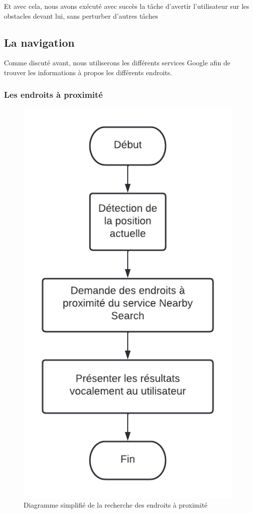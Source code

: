 Et avec cela, nous avons exécuté avec succès la tâche d’avertir l’utilisateur sur les obstacles devant lui, sans perturber d’autres tâches

\subsection{La navigation}
Comme discuté avant, nous utiliserons les différents services Google afin de trouver les informations à propos les différents endroits.

\subsubsection{Les endroits à proximité}

\begin{figure}[!htbp]
    \centering
    \includegraphics[width=.5\linewidth]{assets/app/explore/simplified logigramme.png}
    \caption{Diagramme simplifié de la recherche des endroits à proximité}
\end{figure}

\FloatBarrier
  
